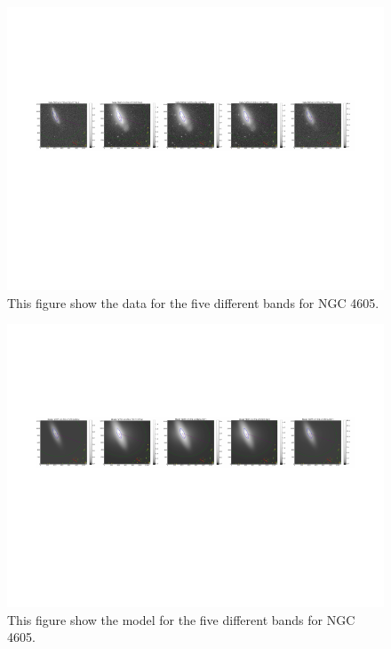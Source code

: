 \documentclass[12pt,preprint,pdftex]{aastex}
\begin{document}
\begin{figure}
\centering
\includegraphics[trim = .9cm 4.5cm 0cm 2.9cm,clip=true,width=\textwidth] {goodsingle-colors-data.pdf}
\caption{This figure show the data for the five different bands for NGC 4605.}
\label{fig:colorsdata}
\end{figure}

\begin{figure}
\centering
\includegraphics[trim = .9cm 4.5cm 0cm 2.9cm,clip=true,width=\textwidth] {goodsingle-colors-model.pdf}
\caption{This figure show the model for the five different bands for NGC 4605.}
\label{fig:colorsmodel}
\end{figure}
\end{document}
